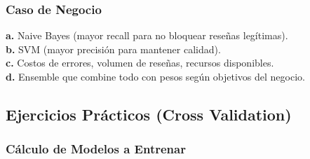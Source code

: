 \documentclass[12pt]{article}
\begin{document}
\subsubsection{Caso de Negocio}

\textbf{a.} Naive Bayes (mayor recall para no bloquear reseñas legítimas). \\
\textbf{b.} SVM (mayor precisión para mantener calidad). \\
\textbf{c.} Costos de errores, volumen de reseñas, recursos disponibles. \\
\textbf{d.} Ensemble que combine todo con pesos según objetivos del negocio.

\subsection{Ejercicios Prácticos (Cross Validation)}

\subsubsection{Cálculo de Modelos a Entrenar}
\end{document}
